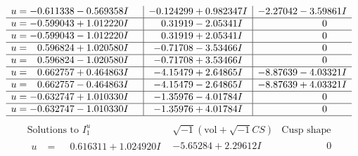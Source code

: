 \documentclass[1p]{elsarticle_modified}
\theoremstyle{definition}
\newcommand{\I}{\sqrt{-1}}
\begin{document}
$$\begin{array}{c|c|c}
\begin{aligned}
u &= -0.611338 - 0.569358 I\end{aligned}
 & -0.124299 + 0.982347 I & -2.27042 - 3.59861 I \\ \hline\begin{aligned}
u &= -0.599043 + 1.012220 I\end{aligned}
 & \phantom{-}0.31919 - 2.05341 I & \phantom{-0.000000 } 0 \\ \hline\begin{aligned}
u &= -0.599043 - 1.012220 I\end{aligned}
 & \phantom{-}0.31919 + 2.05341 I & \phantom{-0.000000 } 0 \\ \hline\begin{aligned}
u &= \phantom{-}0.596824 + 1.020580 I\end{aligned}
 & -0.71708 - 3.53466 I & \phantom{-0.000000 } 0 \\ \hline\begin{aligned}
u &= \phantom{-}0.596824 - 1.020580 I\end{aligned}
 & -0.71708 + 3.53466 I & \phantom{-0.000000 } 0 \\ \hline\begin{aligned}
u &= \phantom{-}0.662757 + 0.464863 I\end{aligned}
 & -4.15479 + 2.64865 I & -8.87639 - 4.03321 I \\ \hline\begin{aligned}
u &= \phantom{-}0.662757 - 0.464863 I\end{aligned}
 & -4.15479 - 2.64865 I & -8.87639 + 4.03321 I \\ \hline\begin{aligned}
u &= -0.632747 + 1.010330 I\end{aligned}
 & -1.35976 - 4.01784 I & \phantom{-0.000000 } 0 \\ \hline\begin{aligned}
u &= -0.632747 - 1.010330 I\end{aligned}
 & -1.35976 + 4.01784 I & \phantom{-0.000000 } 0\\
 \hline 
 \end{array}$$\newpage$$\begin{array}{c|c|c}  
\text{Solutions to }I^u_{1}& \I (\text{vol} + \sqrt{-1}CS) & \text{Cusp shape}\\
 \hline 
\begin{aligned}
u &= \phantom{-}0.616311 + 1.024920 I\end{aligned}
 & -5.65284 + 2.29612 I & \phantom{-0.000000 } 0 \\ \hline\begin{aligned}

\end{aligned}
\end{array}$$
\end{document}
